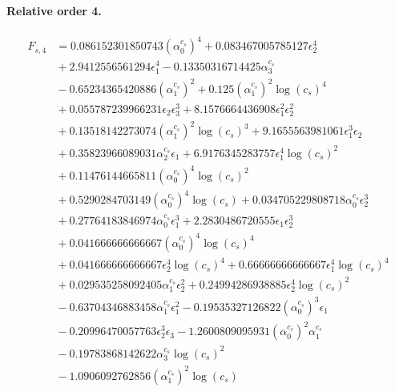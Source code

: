 \documentclass[10pt]{article}
\begin{document}
\paragraph{Relative order 4.}
\begin{align*}
F_{s,4} &= 0.086152301850743 \left(\alpha_{0}^{c_s}\right)^{4} + 0.083467005785127 \epsilon_{2}^{4} \\
&{}  + 2.9412556561294 \epsilon_{1}^{4} - 0.13350316714425 \alpha_{3}^{c_s} \\
&{}  - 0.65234365420886 \left(\alpha_{1}^{c_s}\right)^{2} + 0.125 \left(\alpha_{1}^{c_s}\right)^{2} \log{\left(c_{s} \right)}^{4} \\
&{}  + 0.055787239966231 \epsilon_{2} \epsilon_{3}^{3} + 8.1576664436908 \epsilon_{1}^{2} \epsilon_{2}^{2} \\
&{}  + 0.13518142273074 \left(\alpha_{1}^{c_s}\right)^{2} \log{\left(c_{s} \right)}^{3} + 9.1655563981061 \epsilon_{1}^{3} \epsilon_{2} \\
&{}  + 0.35823966089031 \alpha_{2}^{c_s} \epsilon_{1} + 6.9176345283757 \epsilon_{1}^{4} \log{\left(c_{s} \right)}^{2} \\
&{}  + 0.11476144665811 \left(\alpha_{0}^{c_s}\right)^{4} \log{\left(c_{s} \right)}^{2} \\
&{}  + 0.5290284703149 \left(\alpha_{0}^{c_s}\right)^{4} \log{\left(c_{s} \right)} + 0.034705229808718 \alpha_{0}^{c_s} \epsilon_{2}^{3} \\
&{}  + 0.27764183846974 \alpha_{0}^{c_s} \epsilon_{1}^{3} + 2.2830486720555 \epsilon_{1} \epsilon_{2}^{3} \\
&{}  + 0.041666666666667 \left(\alpha_{0}^{c_s}\right)^{4} \log{\left(c_{s} \right)}^{4} \\
&{}  + 0.041666666666667 \epsilon_{2}^{4} \log{\left(c_{s} \right)}^{4} + 0.66666666666667 \epsilon_{1}^{4} \log{\left(c_{s} \right)}^{4} \\
&{}  + 0.029535258092405 \alpha_{1}^{c_s} \epsilon_{2}^{2} + 0.24994286938885 \epsilon_{2}^{4} \log{\left(c_{s} \right)}^{2} \\
&{}  - 0.63704346883458 \alpha_{1}^{c_s} \epsilon_{1}^{2} - 0.19535327126822 \left(\alpha_{0}^{c_s}\right)^{3} \epsilon_{1} \\
&{}  - 0.20996470057763 \epsilon_{2}^{3} \epsilon_{3} - 1.2600809095931 \left(\alpha_{0}^{c_s}\right)^{2} \alpha_{1}^{c_s} \\
&{}  - 0.19783868142622 \alpha_{3}^{c_s} \log{\left(c_{s} \right)}^{2} \\
&{}  - 1.0906092762856 \left(\alpha_{1}^{c_s}\right)^{2} \log{\left(c_{s} \right)} \\

\end{align*}
\end{document}
